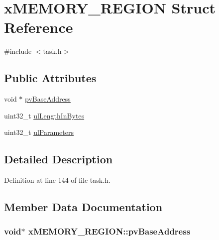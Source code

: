 \hypertarget{structx_m_e_m_o_r_y___r_e_g_i_o_n}{}\section{x\+M\+E\+M\+O\+R\+Y\+\_\+\+R\+E\+G\+I\+ON Struct Reference}
\label{structx_m_e_m_o_r_y___r_e_g_i_o_n}


{\ttfamily \#include $<$task.\+h$>$}

\subsection*{Public Attributes}
\begin{DoxyCompactItemize}
\item 
void $\ast$ \hyperlink{structx_m_e_m_o_r_y___r_e_g_i_o_n_a228036bbfdbc38f170e45deadb166172}{pv\+Base\+Address}
\item 
uint32\+\_\+t \hyperlink{structx_m_e_m_o_r_y___r_e_g_i_o_n_a97e59578d3c4c46270d33e7206258a65}{ul\+Length\+In\+Bytes}
\item 
uint32\+\_\+t \hyperlink{structx_m_e_m_o_r_y___r_e_g_i_o_n_a6ba180553e9a318f23acc5f4664934e3}{ul\+Parameters}
\end{DoxyCompactItemize}


\subsection{Detailed Description}


Definition at line 144 of file task.\+h.



\subsection{Member Data Documentation}
\subsubsection[{\texorpdfstring{pv\+Base\+Address}{pvBaseAddress}}]{\setlength{\rightskip}{0pt plus 5cm}void$\ast$ x\+M\+E\+M\+O\+R\+Y\+\_\+\+R\+E\+G\+I\+O\+N\+::pv\+Base\+Address}\hypertarget{structx_m_e_m_o_r_y___r_e_g_i_o_n_a228036bbfdbc38f170e45deadb166172}{}\label{structx_m_e_m_o_r_y___r_e_g_i_o_n_a228036bbfdbc38f170e45deadb166172}


